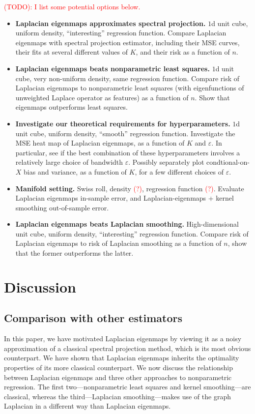 \documentclass{article}
\newcommand{\1}{\mathbf{1}}
\theoremstyle{alden}
\theoremstyle{aldenthm}
\theoremstyle{definition}
\theoremstyle{remark}
\begin{document}
\textcolor{red}{(TODO): I list some potential options below.}
\begin{itemize}
	\item \textbf{Laplacian eigenmaps approximates spectral projection.} $1$d unit cube, uniform density, ``interesting'' regression function. Compare Laplacian eigenmaps with spectral projection estimator, including their MSE curves, their fits at several different values of $K$, and their risk as a function of $n$.
	\item \textbf{Laplacian eigenmaps beats nonparametric least squares.} $1$d unit cube, very non-uniform density, same regression function. Compare risk of Laplacian eigenmaps to nonparametric least squares (with eigenfunctions of unweighted Laplace operator as features) as a function of $n$. Show that eigenmaps outperforms least squares. 
	\item \textbf{Investigate our theoretical requirements for hyperparameters.} $1$d unit cube, uniform density, ``smooth'' regression function. Investigate the MSE heat map of Laplacian eigenmaps, as a function of $K$ and $\varepsilon$. In particular, see if the best combination of these hyperparameters involves a relatively large choice of bandwidth $\varepsilon$. Possibly separately plot condtional-on-$X$ bias and variance, as a function of $K$, for a few different choices of $\varepsilon$.
	\item \textbf{Manifold setting.} Swiss roll, density \textcolor{red}{(?)}, regression function \textcolor{red}{(?)}. Evaluate Laplacian eigenmaps in-sample error, and Laplacian-eigenmaps + kernel smoothing out-of-sample error.
	\item \textbf{Laplacian eigenmaps beats Laplacian smoothing.} High-dimensional unit cube, uniform density, ``interesting'' regression function. Compare risk of Laplacian eigenmaps to risk of Laplacian smoothing as a function of $n$, show that the former outperforms the latter. 
\end{itemize}

\section{Discussion}
\label{sec:discussion}

\subsection{Comparison with other estimators}
In this paper, we have motivated Laplacian eigenmaps by viewing it as a noisy approximation of a classical spectral projection method, which is its most obvious counterpart. We have shown that Laplacian eigenmaps inherits the optimality properties of its more classical counterpart. We now discuss the relationship between Laplacian eigenmaps and three other approaches to nonparametric regression. The first two---nonparametric least squares and kernel smoothing---are classical, whereas the third---Laplacian smoothing---makes use of the graph Laplacian in a different way than Laplacian eigenmaps.
\end{document}
